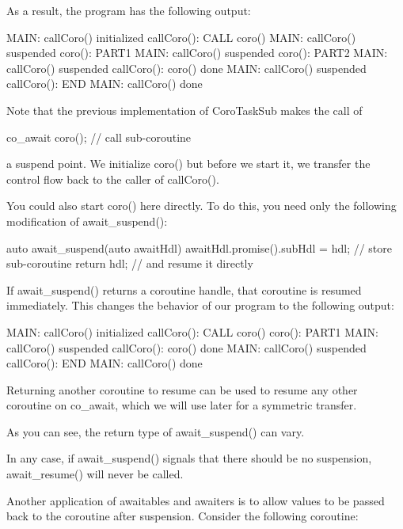 As a result, the program has the following output:

\begin{shell}
MAIN: callCoro() initialized
  callCoro(): CALL coro()
MAIN: callCoro() suspended
    coro(): PART1
MAIN: callCoro() suspended
    coro(): PART2
MAIN: callCoro() suspended
  callCoro(): coro() done
MAIN: callCoro() suspended
  callCoro(): END
MAIN: callCoro() done
\end{shell}


Note that the previous implementation of CoroTaskSub makes the call of

\begin{cpp}
co_await coro(); // call sub-coroutine
\end{cpp}

a suspend point. We initialize coro() but before we start it, we transfer the control flow back to the caller of callCoro().

You could also start coro() here directly. To do this, you need only the following modification of await\_suspend():

\begin{cpp}
auto await_suspend(auto awaitHdl) {
	awaitHdl.promise().subHdl = hdl; // store sub-coroutine
	return hdl; // and resume it directly
}
\end{cpp}

If await\_suspend() returns a coroutine handle, that coroutine is resumed immediately. This changes the behavior of our program to the following output:

\begin{shell}
MAIN: callCoro() initialized
  callCoro(): CALL coro()
    coro(): PART1
MAIN: callCoro() suspended
  callCoro(): coro() done
MAIN: callCoro() suspended
  callCoro(): END
MAIN: callCoro() done
\end{shell}

Returning another coroutine to resume can be used to resume any other coroutine on co\_await, which we will use later for a symmetric transfer.

As you can see, the return type of await\_suspend() can vary.

In any case, if await\_suspend() signals that there should be no suspension, await\_resume() will never be called.


Another application of awaitables and awaiters is to allow values to be passed back to the coroutine after suspension. Consider the following coroutine:

